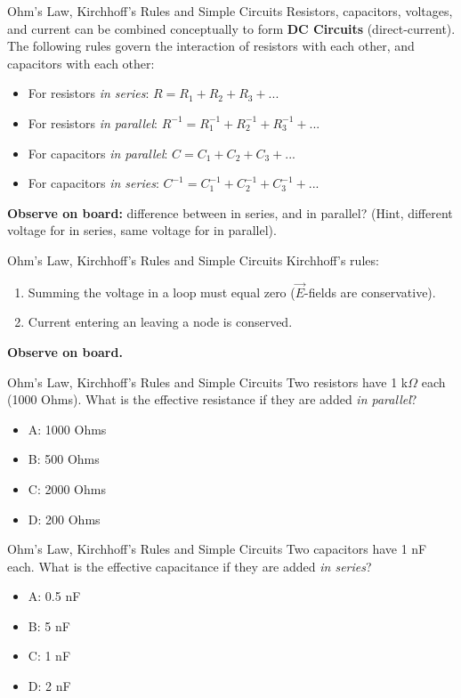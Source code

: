 \documentclass{beamer}
\begin{document}
\begin{frame}{Ohm's Law, Kirchhoff's Rules and Simple Circuits}
Resistors, capacitors, voltages, and current can be combined conceptually to form \alert{\textbf{DC Circuits}} (direct-current).  The following rules govern the interaction of resistors with each other, and capacitors with each other:
\begin{itemize}
\item For resistors \textit{in series}: $R = R_1 + R_2 + R_3 + ...$
\item For resistors \textit{in parallel}: $R^{-1} = R_1^{-1} + R_2^{-1} + R_3^{-1} + ...$
\item For capacitors \textit{in parallel}: $C = C_1 + C_2 + C_3 + ...$
\item For capacitors \textit{in series}: $C^{-1} = C_1^{-1} + C_2^{-1} + C_3^{-1} + ...$
\end{itemize}
\textbf{Observe on board:} difference between in series, and in parallel? (Hint, different voltage for in series, same voltage for in parallel).
\end{frame}

\begin{frame}{Ohm's Law, Kirchhoff's Rules and Simple Circuits}
Kirchhoff's rules:
\begin{enumerate}
\item Summing the voltage in a loop must equal zero ($\vec{E}$-fields are conservative).
\item Current entering an leaving a node is conserved.
\end{enumerate}
\textbf{Observe on board.}
\end{frame}

\begin{frame}{Ohm's Law, Kirchhoff's Rules and Simple Circuits}
Two resistors have 1 k$\Omega$ each (1000 Ohms).  What is the effective resistance if they are added \textit{in parallel}?
\begin{itemize}
\item A: 1000 Ohms
\item B: 500 Ohms
\item C: 2000 Ohms
\item D: 200 Ohms
\end{itemize}
\end{frame}

\begin{frame}{Ohm's Law, Kirchhoff's Rules and Simple Circuits}
Two capacitors have 1 nF each.  What is the effective capacitance if they are added \textit{in series}?
\begin{itemize}
\item A: 0.5 nF
\item B: 5 nF
\item C: 1 nF
\item D: 2 nF
\end{itemize}
\end{frame}
\end{document}
